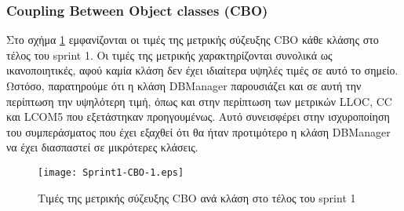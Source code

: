 \subsubsection{Coupling Between Object classes (CBO)}
\label{section:sprint1CBO}

Στο σχήμα \ref{fig:sprint1CBO} εμφανίζονται οι τιμές της μετρικής
σύζευξης CBO κάθε κλάσης στο τέλος του sprint 1. Οι τιμές της μετρικής
χαρακτηρίζονται συνολικά ως ικανοποιητικές, αφού καμία κλάση δεν έχει
ιδιαίτερα υψηλές τιμές σε αυτό το σημείο. Ωστόσο, παρατηρούμε ότι η
κλάση DBManager παρουσιάζει και σε αυτή την περίπτωση την υψηλότερη
τιμή, όπως και στην περίπτωση των μετρικών LLOC, CC και LCOM5 που
εξετάστηκαν προηγουμένως. Αυτό συνεισφέρει στην ισχυροποίηση του
συμπεράσματος που έχει εξαχθεί ότι θα ήταν προτιμότερο η κλάση DBManager
να έχει διασπαστεί σε μικρότερες κλάσεις.

\begin{figure}
\centering
\texttt{[image: Sprint1-CBO-1.eps]}
\caption{Τιμές της μετρικής σύζευξης CBO ανά κλάση στο τέλος του sprint 1}
\label{fig:sprint1CBO}
\end{figure}
